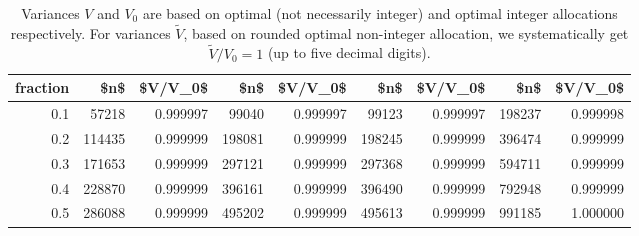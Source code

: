 \begin{table}

\caption{\label{tab:}
\footnotesize Variances $V$ and $V_0$ are based on optimal (not necessarily integer)
and optimal integer allocations respectively.
For variances $\tilde{V}$, based on rounded optimal non-integer allocation,
we systematically get $\tilde{V}/V_0=1$ (up to five decimal digits).}
\centering
\begin{tabular}[t]{r|r|r|r|r|r|r|r|r}
\hline
fraction & \$n\$ & \$V/V\_0\$ & \$n\$ & \$V/V\_0\$ & \$n\$ & \$V/V\_0\$ & \$n\$ & \$V/V\_0\$\\
\hline
0.1 & 57218 & 0.999997 & 99040 & 0.999997 & 99123 & 0.999997 & 198237 & 0.999998\\
\hline
0.2 & 114435 & 0.999999 & 198081 & 0.999999 & 198245 & 0.999999 & 396474 & 0.999999\\
\hline
0.3 & 171653 & 0.999999 & 297121 & 0.999999 & 297368 & 0.999999 & 594711 & 0.999999\\
\hline
0.4 & 228870 & 0.999999 & 396161 & 0.999999 & 396490 & 0.999999 & 792948 & 0.999999\\
\hline
0.5 & 286088 & 0.999999 & 495202 & 0.999999 & 495613 & 0.999999 & 991185 & 1.000000\\
\hline
\end{tabular}
\end{table}